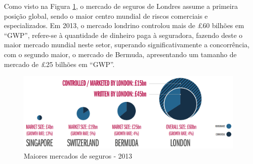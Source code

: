         
                
            Como visto na Figura \ref{fig:biggest-insurance-markets}, o mercado de seguros de Londres assume a primeira posição global, sendo o maior centro mundial de riscos comerciais e especializados. Em 2013, o mercado londrino controlou mais de £60 bilhões em ``GWP'', refere-se à quantidade de dinheiro paga à seguradora, fazendo deste o maior mercado mundial neste setor, superando significativamente a concorrência, com o segundo maior, o mercado de Bermuda, apresentando um tamanho de mercado de £25 bilhões em ``GWP''\cite{the-competitive-position-of-the-london-insurance-market,how-the-london-insurance-market-works}. %
        
            \begin{figure}[H]
                \centering
                \includegraphics[width=\textwidth]{imgs/Biggest_Insurance_Markets.png}
                    \caption{Maiores mercados de seguros - 2013}\label{fig:biggest-insurance-markets}
            \end{figure}

